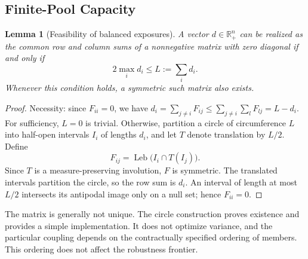 \documentclass[11pt,a4paper]{article}
\newtheorem{lemma}[theorem]{Lemma}
\theoremstyle{definition}\newtheorem{definition}[theorem]{Definition}
\theoremstyle{remark}\newtheorem{remark}[theorem]{Remark}
\newcommand{\R}{\mathbb R}
\begin{document}
\subsection{Finite-Pool Capacity}
\begin{lemma}[Feasibility of balanced exposures]\label{lem:circle}
A vector $d\in\R_+^n$ can be realized as the common row and column sums of a nonnegative matrix with zero diagonal if and only if
\begin{equation}\label{eq:degree}
2\max_i d_i\le L:=\sum_i d_i.
\end{equation}
Whenever this condition holds, a symmetric such matrix also exists.
\end{lemma}
\begin{proof}
Necessity: since $F_{ii}=0$, we have $d_i=\sum_{j\ne i}F_{ij}\le\sum_{j\ne i}\sum_lF_{lj}=L-d_i$.
For sufficiency, $L=0$ is trivial. Otherwise, partition a circle of circumference $L$ into half-open intervals $I_i$ of lengths $d_i$, and let $T$ denote translation by $L/2$. Define
\[
F_{ij}=\operatorname{Leb}\bigl(I_i\cap T(I_j)\bigr).
\]
Since $T$ is a measure-preserving involution, $F$ is symmetric. The translated intervals partition the circle, so the row sum is $d_i$. An interval of length at most $L/2$ intersects its antipodal image only on a null set; hence $F_{ii}=0$.
\end{proof}

The matrix is generally not unique. The circle construction proves existence and provides a simple implementation. It does not optimize variance, and the particular coupling depends on the contractually specified ordering of members. This ordering does not affect the robustness frontier.
\end{document}
